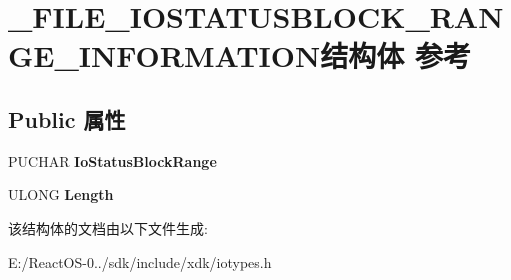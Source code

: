 \hypertarget{struct___f_i_l_e___i_o_s_t_a_t_u_s_b_l_o_c_k___r_a_n_g_e___i_n_f_o_r_m_a_t_i_o_n}{}\section{\+\_\+\+F\+I\+L\+E\+\_\+\+I\+O\+S\+T\+A\+T\+U\+S\+B\+L\+O\+C\+K\+\_\+\+R\+A\+N\+G\+E\+\_\+\+I\+N\+F\+O\+R\+M\+A\+T\+I\+O\+N结构体 参考}
\label{struct___f_i_l_e___i_o_s_t_a_t_u_s_b_l_o_c_k___r_a_n_g_e___i_n_f_o_r_m_a_t_i_o_n}
\subsection*{Public 属性}
\begin{DoxyCompactItemize}
\item 
\mbox{\label{struct___f_i_l_e___i_o_s_t_a_t_u_s_b_l_o_c_k___r_a_n_g_e___i_n_f_o_r_m_a_t_i_o_n_ac1e2179418daef3c66316db77eb7caff}} 
P\+U\+C\+H\+AR {\bfseries Io\+Status\+Block\+Range}
\item 
\mbox{\label{struct___f_i_l_e___i_o_s_t_a_t_u_s_b_l_o_c_k___r_a_n_g_e___i_n_f_o_r_m_a_t_i_o_n_aa87aa3fc16444dc2923930797c297585}} 
U\+L\+O\+NG {\bfseries Length}
\end{DoxyCompactItemize}


该结构体的文档由以下文件生成\+:\begin{DoxyCompactItemize}
\item 
E\+:/\+React\+O\+S-\/0../sdk/include/xdk/iotypes.\+h\end{DoxyCompactItemize}
